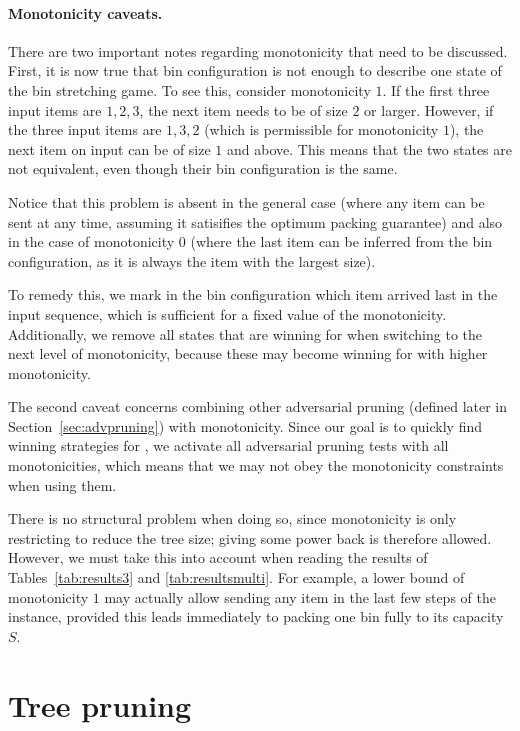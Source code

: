 \paragraph{Monotonicity caveats.} There are two important notes
regarding monotonicity that need to be discussed. First, it is now
true that bin configuration is not enough to describe one state of the
bin stretching game. To see this, consider monotonicity $1$. If the
first three input items are $1,2,3$, the next item needs to be of size
$2$ or larger. However, if the three input items are $1,3,2$ (which is
permissible for monotonicity $1$), the next item on input can be of
size $1$ and above. This means that the two states are not equivalent,
even though their bin configuration is the same.

Notice that this problem is absent in the general case (where any item
can be sent at any time, assuming it satisifies the optimum packing
guarantee) and also in the case of monotonicity $0$ (where the last
item can be inferred from the bin configuration, as it is always the
item with the largest size).

To remedy this, we mark in the bin configuration which item arrived
last in the input sequence, which is sufficient for a fixed value of
the monotonicity. Additionally, we remove all states that are winning
for \algo when switching to the next level of monotonicity, because
these may become winning for \adversary with higher monotonicity.

The second caveat concerns combining other adversarial pruning
(defined later in Section~\ref{sec:advpruning}) with monotonicity.
Since our goal is to quickly find winning strategies for \adversary,
we activate all adversarial pruning tests with all monotonicities,
which means that we may not obey the monotonicity constraints when
using them.

There is no structural problem when doing so, since monotonicity is
only restricting \adversary to reduce the tree size; giving \adversary
some power back is therefore allowed. However, we must take this into
account when reading the results of Tables~\ref{tab:results3} and
\ref{tab:resultsmulti}. For example, a lower bound of monotonicity $1$
may actually allow sending any item in the last few steps of the
instance, provided this leads immediately to \algo packing one
bin fully to its capacity $S$.

\section{Tree pruning}\label{sec:4:pruning}

